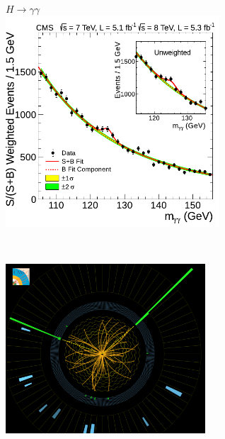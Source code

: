 \documentclass[xcolor={usenames,dvipsnames,svgnames,table}]{beamer}
\begin{document}
\begin{frame}
\begin{columns}
\begin{column}{0.49\textwidth}
	    \end{column}
    \begin{column}{0.49\textwidth}
        \begin{figure}[t]
			\\
			\vspace{-0.5cm}
			\centering \textcolor{color1}{$H \rightarrow \gamma\gamma$}\\
            \includegraphics[width=0.75\textwidth]{plots/higgsGG_discovery.pdf}
        \end{figure}\\
		\vspace{-0.9cm}
		\begin{figure}[t]
			\includegraphics[width=0.7\textwidth]{plots/cms_event_display.png}
        \end{figure}
    \end{column}
	\end{columns}
\end{frame}
\end{document}
